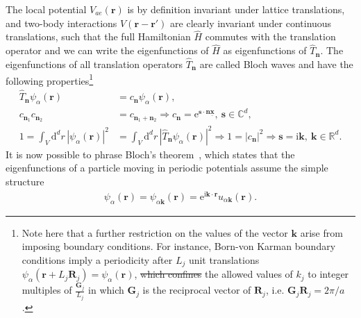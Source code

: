 \documentclass{svmono}
\def\ri{\mathrm i}
\def\re{\mathrm e}
\def\rd{\mathrm d}
\newcommand{\abs}[1]{\left| #1 \right|}
\providecommand{\DIFaddtex}[1]{{\protect\color{blue}\uwave{#1}}} %
\providecommand{\DIFdeltex}[1]{{\protect\color{red}\sout{#1}}}                      %
\providecommand{\DIFaddbegin}{} %
\providecommand{\DIFaddend}{} %
\providecommand{\DIFdelbegin}{} %
\providecommand{\DIFdelend}{} %
\providecommand{\DIFadd}[1]{\texorpdfstring{\DIFaddtex{#1}}{#1}} %
\providecommand{\DIFdel}[1]{\texorpdfstring{\DIFdeltex{#1}}{}} %
\newcommand{\DIFscaledelfig}{0.5}
\newlength{\DIFdelgraphicswidth} %
\newlength{\DIFdelgraphicsheight} %
\newcommand{\DIFaddincludegraphics}[2][]{{\color{blue}\fbox{\DIFOincludegraphics[#1]{#2}}}} %
\newcommand{\DIFdelincludegraphics}[2][]{%
\sbox{\DIFdelgraphicsbox}{\DIFOincludegraphics[#1]{#2}}%
\settoboxwidth{\DIFdelgraphicswidth}{\DIFdelgraphicsbox} %
\settoboxtotalheight{\DIFdelgraphicsheight}{\DIFdelgraphicsbox} %
\scalebox{\DIFscaledelfig}{%
\parbox[b]{\DIFdelgraphicswidth}{\usebox{\DIFdelgraphicsbox}\\[-\baselineskip] \rule{\DIFdelgraphicswidth}{0em}}\llap{\resizebox{\DIFdelgraphicswidth}{\DIFdelgraphicsheight}{%
\setlength{\unitlength}{\DIFdelgraphicswidth}%
\begin{picture}(1,1)%
\thicklines\linethickness{2pt} %
{\color[rgb]{1,0,0}\put(0,0){\framebox(1,1){}}}%
{\color[rgb]{1,0,0}\put(0,0){\line( 1,1){1}}}%
{\color[rgb]{1,0,0}\put(0,1){\line(1,-1){1}}}%
\end{picture}%
}\hspace*{3pt}}} %
} %
\DeclareRobustCommand{\DIFaddbegin}{\DIFOaddbegin \let\includegraphics\DIFaddincludegraphics} %
\DeclareRobustCommand{\DIFaddend}{\DIFOaddend \let\includegraphics\DIFOincludegraphics} %
\DeclareRobustCommand{\DIFdelbegin}{\DIFOdelbegin \let\includegraphics\DIFdelincludegraphics} %
\DeclareRobustCommand{\DIFdelend}{\DIFOaddend \let\includegraphics\DIFOincludegraphics} %
\begin{document}
The local potential $V_{ae}({\bm r})$ is by definition invariant under lattice translations, and two-body interactions $V({\bm r}-{\bm r'})$ are clearly invariant under continuous translations, such that the full Hamiltonian $\hat H$ commutes with the translation operator and we can write the eigenfunctions of $\hat H$ as eigenfunctions of $\hat T_{\bm n}$.
The eigenfunctions of all translation operators $\hat T_{\bm n}$ are called Bloch waves and have the following properties\footnote{Note here that a further restriction on the values of the vector ${\bm k}$ arise from imposing boundary conditions. For instance, Born-von Karman boundary conditions imply a periodicity after $L_j$ unit translations $\psi_\alpha({\bm r}+ L_j{\bm R}_j)=\psi_\alpha({\bm r})$, \DIFdelbegin \DIFdel{which confines }\DIFdelend \DIFaddbegin \DIFadd{confining }\DIFaddend the allowed values of $k_j$ to integer multiples of $\frac{\bm G_j}{L_j}$ in which $\bm G_j$ is the reciprocal vector of ${\bm R}_j$, i.e. ${\bm G}_j {\bm R}_j = 2\pi/a$.}
\DIFdelbegin %
\DIFdelend \DIFaddbegin \begin{align}
    \hat T_{\bm n}\psi_{\alpha}({\bm r}) &= c_{\bm n}\psi_{\alpha}({\bm r}),\\
    c_{{\bm n}_1}c_{{\bm n}_2} &= c_{{\bm n}_1+{\bm n}_2} \Rightarrow c_{\bm n} = \re^{{\bm s}\cdot{\bm n}\underline{\bm x}},\ {\bm s}\in\mathds C^d,\\
    1=\int_V\rd^dr\,\abs{\psi_{\alpha}({\bm r})}^2 &= \int_V\rd^dr\,\abs{\hat T_{\bm n}\psi_{\alpha}({\bm r})}^2 \Rightarrow 1=\abs{c_{\bm n}}^2 \Rightarrow {\bm s}=\ri{\bm k},\ {\bm k}\in\mathds R^d.
\end{align}\DIFaddend 
It is now possible to phrase Bloch's theorem~\cite{Bloch1929}, which states that the eigenfunctions of a particle moving in periodic potentials assume the simple structure
\begin{align}
    \psi_\alpha({\bm r}) = \psi_{\alpha{\bm k}}({\bm r}) = \re^{\ri{\bm k}\cdot {\bm r}}u_{\alpha{\bm k}}({\bm r}).
    \label{eq:bloch_theorem}
\end{align}
\end{document}
